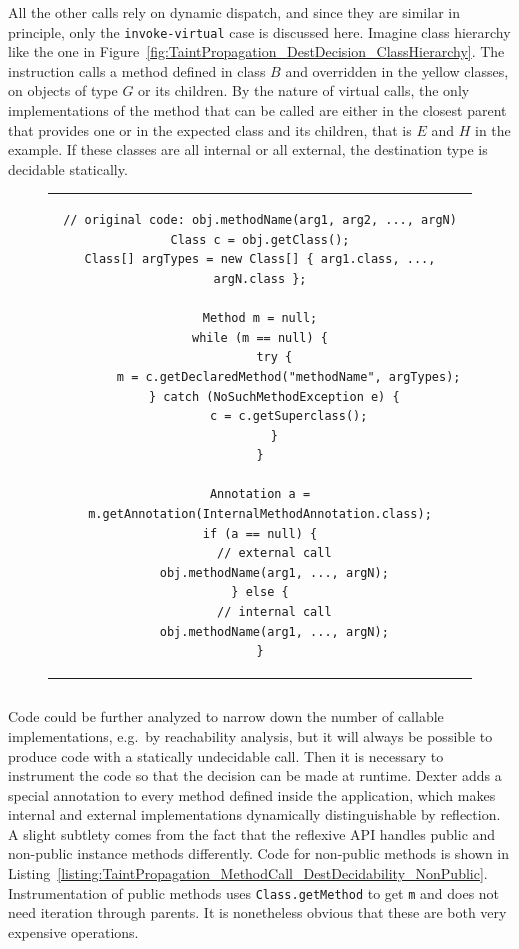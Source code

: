 \documentclass[12pt,twoside,notitlepage]{report}
\begin{document}
All the other calls rely on dynamic dispatch, and since they are similar in principle, only the \verb$invoke-virtual$ case is discussed here. Imagine class hierarchy like the one in Figure~\ref{fig:TaintPropagation_DestDecision_ClassHierarchy}. The instruction calls a method defined in class $B$ and overridden in the yellow classes, on objects of type $G$ or its children. By the nature of virtual calls, the only implementations of the method that can be called are either in the closest parent that provides one or in the expected class and its children, that is $E$ and $H$ in the example. If these classes are all internal or all external, the destination type is decidable statically. 

\begin{figure}
	\centering
	\begin{tabular}{c}
	\begin{lstlisting}
// original code: obj.methodName(arg1, arg2, ..., argN)
Class c = obj.getClass();
Class[] argTypes = new Class[] { arg1.class, ..., argN.class };

Method m = null;
while (m == null) {
	try {
 		m = c.getDeclaredMethod("methodName", argTypes);
 	} catch (NoSuchMethodException e) {
 		c = c.getSuperclass();
 	}
}

Annotation a = m.getAnnotation(InternalMethodAnnotation.class);
if (a == null) {
	// external call
	obj.methodName(arg1, ..., argN);
} else {
	// internal call
	obj.methodName(arg1, ..., argN);
}
	\end{lstlisting}
	\end{tabular}
	\begin{lstlisting}[caption={Destination-deciding instrumentation for non-public methods},
	                   label={listing:TaintPropagation_MethodCall_DestDecidability_NonPublic}]
	\end{lstlisting}
\end{figure}

Code could be further analyzed to narrow down the number of callable implementations, e.g.\ by reachability analysis, but it will always be possible to produce code with a statically undecidable call. Then it is necessary to instrument the code so that the decision can be made at runtime. Dexter adds a special annotation to every method defined inside the application, which makes internal and external implementations dynamically distinguishable by reflection. A slight subtlety comes from the fact that the reflexive API handles public and non-public instance methods differently. Code for non-public methods is shown in Listing~\ref{listing:TaintPropagation_MethodCall_DestDecidability_NonPublic}. Instrumentation of public methods uses \verb$Class.getMethod$ to get \verb$m$ and does not need iteration through parents. It is nonetheless obvious that these are both very expensive operations. 
\end{document}
